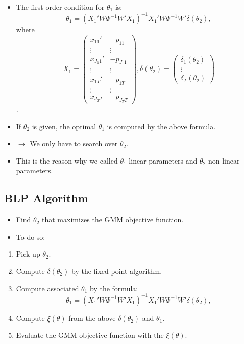 \documentclass[
]{book}
\providecommand{\tightlist}{%
  \setlength{\itemsep}{0pt}\setlength{\parskip}{0pt}}
\begin{document}
\begin{itemize}
\tightlist
\item
  The first-order condition for \(\theta_1\) is:
  \begin{equation}
  \theta_1 = (X_1'W \Phi^{-1} W'X_1)^{-1} X_1' W \Phi^{-1} W' \delta(\theta_2),
  \end{equation}
  where
  \begin{equation}
  X_1 = 
  \begin{pmatrix}
  x_{11}' & - p_{11}\\
  \vdots & \vdots \\
  x_{J_1 1}' & - p_{J_1 1}\\
  \vdots & \vdots \\
  x_{1T}' & - p_{1T}\\
  \vdots & \vdots \\
  x_{J_T T} & - p_{J_T T}
  \end{pmatrix},
  \delta(\theta_2) =
  \begin{pmatrix}
  \delta_1(\theta_2)\\
  \vdots\\
  \delta_T(\theta_2)
  \end{pmatrix}
  \end{equation}.
\item
  If \(\theta_2\) is given, the optimal \(\theta_1\) is computed by the above formula.
\item
  \(\rightarrow\) We only have to search over \(\theta_2\).
\item
  This is the reason why we called \(\theta_1\) linear parameters and \(\theta_2\) non-linear parameters.
\end{itemize}

\hypertarget{blp-algorithm}{%
\subsection{BLP Algorithm}\label{blp-algorithm}}

\begin{itemize}
\tightlist
\item
  Find \(\theta_2\) that maximizes the GMM objective function.
\item
  To do so:
\end{itemize}

\begin{enumerate}
\def\labelenumi{\arabic{enumi}.}
\tightlist
\item
  Pick up \(\theta_2\).
\item
  Compute \(\delta(\theta_2)\) by the fixed-point algorithm.
\item
  Compute associated \(\theta_1\) by the formula:
  \begin{equation}
  \theta_1 = (X_1'W \Phi^{-1} W'X_1)^{-1} X_1' W \Phi^{-1} W' \delta(\theta_2),
  \end{equation}
\item
  Compute \(\xi(\theta)\) from the above \(\delta(\theta_2)\) and \(\theta_1\).
\item
  Evaluate the GMM objective function with the \(\xi(\theta)\).
\end{enumerate}
\end{document}
